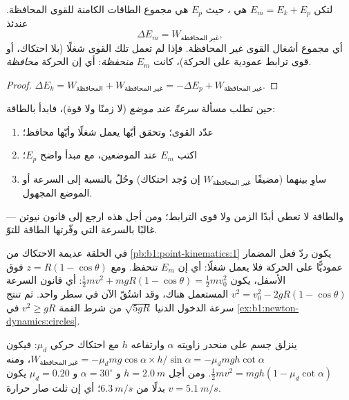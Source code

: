 \begin{theorem}\label{thm:b1:work-and-energy:em}
لتكن $E_m = E_k + E_p$ هي \emph{}، حيث $E_p$ هي
مجموع الطاقات الكامنة للقوى المحافظة. عندئذ
\[
\Delta E_m = W_{\text{غير المحافظة}} ,
\]
أي مجموع أشغال القوى غير المحافظة. فإذا لم تعمل تلك القوى
شغلًا (بلا احتكاك، أو قوى ترابط عمودية على الحركة)، كانت $E_m$
\emph{منحفظة}: أي إن الحركة \emph{محافظة}.
\end{theorem}

\begin{proof}
$\Delta E_k = W_{\text{المحافظة}} + W_{\text{غير المحافظة}} = -\Delta E_p + W_{\text{غير المحافظة}}$.
\end{proof}

\begin{method}\label{met:b1:work-and-energy:method}
حين تطلب مسألة \emph{سرعةً عند موضع} (لا زمنًا ولا
قوة)، فابدأ بالطاقة:
\begin{enumerate}
  \item عدّد القوى؛ وتحقق أيّها يعمل شغلًا وأيّها محافظ؛
  \item اكتب $E_m$ عند الموضعين، مع مبدأ واضح  $E_p$؛
  \item ساوِ بينهما (مضيفًا $W_{\text{غير المحافظة}}$ إن وُجد احتكاك) وحُلّ
        بالنسبة إلى السرعة أو الموضع المجهول.
\end{enumerate}
والطاقة لا تعطي أبدًا الزمن ولا قوى الترابط؛ ومن أجل هذه ارجع
إلى قانون نيوتن --- غالبًا بالسرعة التي وفّرتها الطاقة للتوّ.
\end{method}

\begin{example}\label{ex:b1:work-and-energy:loop}
في الحلقة عديمة الاحتكاك من \cref{pb:b1:point-kinematics:1} يكون ردّ فعل
المضمار عموديًّا على الحركة فلا يعمل شغلًا: أي إن $E_m$ تنحفظ.
ومع $z = R(1 - \cos\theta)$ فوق الأسفل، يكون $\tfrac12 mv^2 + mgR(1 -
\cos\theta) = \tfrac12 mv_0^2$: أي قانون السرعة $v^2 = v_0^2 - 2gR(1 -
\cos\theta)$ المستعمل هناك، وقد اشتُقّ الآن في سطر واحد. ثم تنتج سرعة
الدخول الدنيا $\sqrt{5gR}$ من شرط القمة
$v^2 \geq gR$ في \cref{ex:b1:newton-dynamics:circles}.
\end{example}

\begin{example}\label{ex:b1:work-and-energy:friction}
ينزلق جسم على منحدر زاويته $\alpha$ وارتفاعه $h$ مع
احتكاك حركي $\mu_d$: فيكون $W_{\text{غير المحافظة}} = -\mu_dmg\cos\alpha \times
h/\sin\alpha = -\mu_dmgh\cot\alpha$، ومنه $\tfrac12 mv^2 = mgh(1 - \mu_d\cot\alpha)$.
ومن أجل $h = \qty{2.0}{m}$ و $\alpha = 30^\circ$ و $\mu_d = 0.20$ يكون $v =
\qty{5.1}{m/s}$ بدلًا من $\qty{6.3}{m/s}$؛ أي إن ثلث  صار حرارة.
\end{example}

